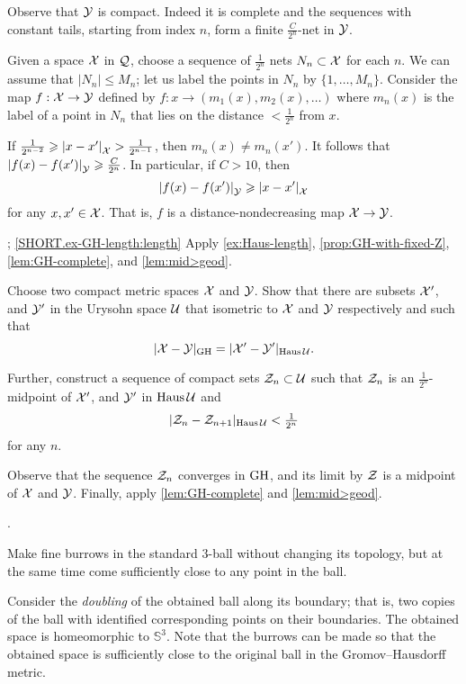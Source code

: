 Observe that $\mathcal{Y}$ is compact.
Indeed it is complete and the sequences with constant tails, starting from index $n$, form a finite $\tfrac C{2^{n}}$-net in $\mathcal{Y}$.

Given a space $\mathcal{X}$ in $\mathcal{Q}$,
choose a sequence of $\tfrac1{2^n}$ nets 
$N_n\subset\mathcal{X}$ for each $n$.
We can assume that $|N_n|\le M_n$; let us label the points in $N_n$ by $\{1,\dots,M_n\}$.
Consider the map $f:\mathcal{X}\to\mathcal{Y}$ defined by $f:x\to (m_1(x),m_2(x),\dots)$ where $m_n(x)$ is the label of a point in $N_n$ that lies on the distance $<\tfrac1{2^n}$ from $x$.

If $\tfrac1{2^{n-2}}\ge \dist{x}{x'}{\spc{X}}>\tfrac1{2^{n-1}}$, then $m_n(x)\ne m_n(x')$.
It follows that $\dist{f(x)}{f(x')}{\spc{Y}}\ge \tfrac C{2^{n}}$.
In particular, if $C>10$, then 
\[\dist{f(x)}{f(x')}{\spc{Y}}\ge \dist{x}{x'}{\spc{X}}\]
for any $x,x'\in \mathcal{X}$.
That is, $f$ is a distance-nondecreasing map $\mathcal{X}\to \mathcal{Y}$.

\parbf{\ref{ex-GH-length}}; \ref{SHORT.ex-GH-length:length}
Apply
\ref{ex:Haus-length},
\ref{prop:GH-with-fixed-Z},
\ref{lem:GH-complete},
and \ref{lem:mid>geod}.

Choose two compact metric spaces $\mathcal{X}$ and $\mathcal{Y}$.
Show that there are subsets $\mathcal{X}'$, and $\mathcal{Y}'$ in the Urysohn space $\mathcal{U}$ that isometric to $\mathcal{X}$ and $\mathcal{Y}$ respectively and such that 
\[|\mathcal{X}-\mathcal{Y}|_{\operatorname{\rm GH}\nolimits} = |\mathcal{X}'-\mathcal{Y}'|_{\operatorname{\rm Haus}\nolimits\mathcal{U}}.\]

Further, construct a sequence of compact sets $\mathcal{Z}_n\subset \mathcal{U}$ such that $\mathcal{Z}_n$ is an $\tfrac1{2^n}$-midpoint of $\mathcal{X}'$, and $\mathcal{Y}'$ in $\operatorname{\rm Haus}\nolimits\mathcal{U}$ and 
\[|\mathcal{Z}_n-\mathcal{Z}_{n+1}|_{\operatorname{\rm Haus}\nolimits\mathcal{U}}<\tfrac1{2^n}\]
for any $n$.

Observe that the sequence $\mathcal{Z}_n$ converges in $\operatorname{\rm GH}\nolimits$, and its limit by $\mathcal{Z}$ is a midpoint of $\mathcal{X}$ and $\mathcal{Y}$.
Finally, apply \ref{lem:GH-complete} and \ref{lem:mid>geod}.

 \cite{ivanov-nikolaeva-tuzhilin}.



Make fine burrows in the standard 3-ball without changing its topology,
but at the same time come sufficiently close to any point in the ball.

Consider the \emph{doubling} of the obtained ball along its boundary;
that is, two copies of the ball with identified corresponding points on their boundaries.
The obtained space is homeomorphic to $\mathbb{S}^3$.
Note that the burrows can be made 
so that the obtained space is sufficiently close to the original ball 
in the Gromov--Hausdorff metric.

